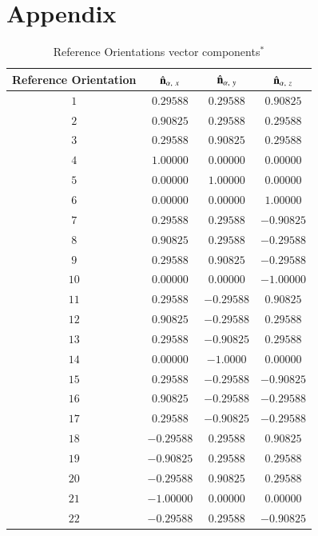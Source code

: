 \documentclass[final, 3p]{elsarticle}
\begin{document}
\section*{Appendix}
\setcounter{table}{0}
\renewcommand{\thetable}{A\arabic{table}}
\label{sec:App1}
\begin{table}[h]
\begin{center}
\caption{\label{tab:A1}
%
Reference Orientations vector components$^*$}
\begin{tabular}{|c|c|c|c|}
\hline\hline
Reference Orientation & $\hat{\bf n}_{\alpha,\ x}$ &  $\hat{\bf n}_{\alpha,\ y}$ &  $\hat{\bf n}_{\alpha,\ z}$ \\
\hline
$1$  & $ 0.29588$ &  $ 0.29588$ & $ 0.90825$ \\
$2$  & $ 0.90825$ &  $ 0.29588$ & $ 0.29588$ \\
$3$  & $ 0.29588$ &  $ 0.90825$ & $ 0.29588$ \\
$4$  & $ 1.00000$ &  $ 0.00000$ & $ 0.00000$ \\
$5$  & $ 0.00000$ &  $ 1.00000$ & $ 0.00000$ \\
$6$  & $ 0.00000$ &  $ 0.00000$ & $ 1.00000$ \\
$7$  & $ 0.29588$ &  $ 0.29588$ & $-0.90825$ \\
$8$  & $ 0.90825$ &  $ 0.29588$ & $-0.29588$ \\
$9$  & $ 0.29588$ &  $ 0.90825$ & $-0.29588$ \\
$10$ & $ 0.00000$ &  $ 0.00000$ & $-1.00000$ \\
$11$ & $ 0.29588$ &  $-0.29588$ & $ 0.90825$ \\
$12$ & $ 0.90825$ &  $-0.29588$ & $ 0.29588$ \\
$13$ & $ 0.29588$ &  $-0.90825$ & $ 0.29588$ \\
$14$ & $ 0.00000$ &  $ -1.0000$ & $ 0.00000$ \\
$15$ & $ 0.29588$ &  $-0.29588$ & $-0.90825$ \\
$16$ & $ 0.90825$ &  $-0.29588$ & $-0.29588$ \\
$17$ & $ 0.29588$ &  $-0.90825$ & $-0.29588$ \\
$18$ & $-0.29588$ &  $ 0.29588$ & $ 0.90825$ \\
$19$ & $-0.90825$ &  $ 0.29588$ & $ 0.29588$ \\
$20$ & $-0.29588$ &  $ 0.90825$ & $ 0.29588$ \\
$21$ & $-1.00000$ &  $ 0.00000$ & $ 0.00000$ \\
$22$ & $-0.29588$ &  $ 0.29588$ & $-0.90825$ \\

\end{tabular}
\end{center}
\end{table}
\end{document}
